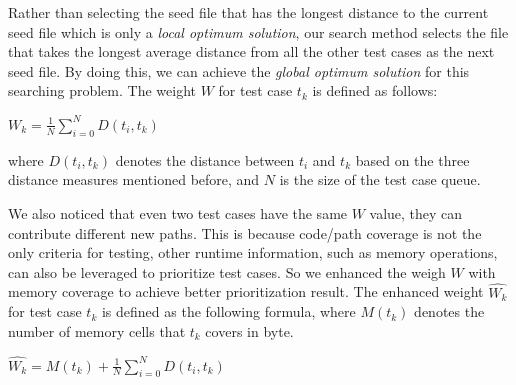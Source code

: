 Rather than selecting the seed file that has the longest distance to the current seed file which is only a \emph{local optimum solution}, our search method selects the file that takes the longest average distance from all the other test cases as the next seed file. By doing this, we can achieve the \emph{global optimum solution} for this searching problem. The weight $W$ for test case $t_k$ is defined as follows:

\begin{center}
$W_k = \displaystyle\frac{1}{N} \sum_{i=0}^{N} D(t_i, t_k)$
\end{center}
where $D(t_i, t_k)$ denotes the distance between $t_i$ and $t_k$ based on the three distance measures mentioned before, and $N$ is the size of the test case queue. 

We also noticed that even two test cases have the same $W$ value, they can contribute different new paths. This is because code/path coverage is not the only criteria for testing, other runtime information, such as memory operations, can also be leveraged to prioritize test cases. So we enhanced the weigh $W$ with memory coverage to achieve better prioritization result. The enhanced weight $\hat{W_k}$ for test case $t_k$ is defined as the following formula, where $M(t_k)$ denotes the number of memory cells that $t_k$ covers in byte.
\begin{center}
$\hat{W_k} = \displaystyle M(t_k) + \frac{1}{N} \sum_{i=0}^{N} D(t_i, t_k)$
\end{center} 